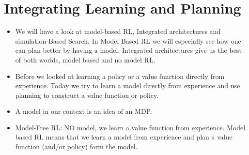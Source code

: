 \documentclass[a4paper]{article}
\begin{document}
\section{Integrating Learning and Planning}
\begin{itemize}
    \item We will have a look at model-based RL, Integrated architectures and simulation-Based Search. In Model Based RL we will especially see how one can plan better by having a model. Integrated architectures give us the best of both worlds, model based and no model RL. 
    \item Before we looked at learning a policy or a value function directly from experience. Today we try to learn a model directly from experience and use planning to construct a value function or policy. 
    \item A model in our context is an idea of an MDP. 
    \item Model-Free RL: NO model, we learn a value function from experience. Model based RL means that we learn a model from experience and plan a value function (and/or policy) form the model. 
    \end{itemize}
\end{document}
